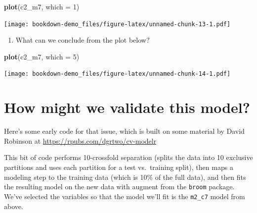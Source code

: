 \documentclass[]{book}
\newenvironment{Shaded}{\begin{snugshade}}{\end{snugshade}}
\newcommand{\KeywordTok}[1]{\textcolor[rgb]{0.13,0.29,0.53}{\textbf{#1}}}
\newcommand{\DataTypeTok}[1]{\textcolor[rgb]{0.13,0.29,0.53}{#1}}
\newcommand{\DecValTok}[1]{\textcolor[rgb]{0.00,0.00,0.81}{#1}}
\newcommand{\NormalTok}[1]{#1}
\providecommand{\tightlist}{%
  \setlength{\itemsep}{0pt}\setlength{\parskip}{0pt}}
\theoremstyle{definition}
\theoremstyle{definition}
\theoremstyle{definition}
\theoremstyle{remark}
\begin{document}
\begin{Shaded}
\begin{Highlighting}[]
\KeywordTok{plot}\NormalTok{(c2_m7, }\DataTypeTok{which =} \DecValTok{1}\NormalTok{)}
\end{Highlighting}
\end{Shaded}

\texttt{[image: bookdown-demo\_files/figure-latex/unnamed-chunk-13-1.pdf]}

\begin{enumerate}
\def\labelenumi{\arabic{enumi}.}
\setcounter{enumi}{1}
\tightlist
\item
  What can we conclude from the plot below?
\end{enumerate}

\begin{Shaded}
\begin{Highlighting}[]
\KeywordTok{plot}\NormalTok{(c2_m7, }\DataTypeTok{which =} \DecValTok{5}\NormalTok{)}
\end{Highlighting}
\end{Shaded}

\texttt{[image: bookdown-demo\_files/figure-latex/unnamed-chunk-14-1.pdf]}

\section{How might we validate this
model?}\label{how-might-we-validate-this-model}

Here's some early code for that issue, which is built on some material
by David Robinson at \url{https://rpubs.com/dgrtwo/cv-modelr}

This bit of code performs 10-crossfold separation (splits the data into
10 exclusive partitions and uses each partition for a test vs.~training
split), then maps a modeling step to the training data (which is 10\% of
the full data), and then fits the resulting model on the new data with
augment from the \texttt{broom} package. We've selected the variables so
that the model we'll fit is the \texttt{m2\_c7} model from above.
\end{document}
